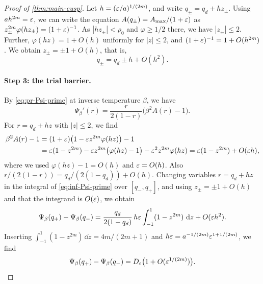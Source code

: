 \begin{proof}[Proof of \cref{thm:main-cusp}]
Let $h=(\varepsilon/a)^{1/(2m)}$, and write $q_\pm=q_d+hz_\pm$. Using $ah^{2m}=\varepsilon$, we can write the equation $A(q_\pm)=A_{\max}/(1+\varepsilon)$ as $z_\pm^{2m}\varphi(hz_\pm)=(1+\varepsilon)^{-1}$. As $|hz_\pm|<\rho_0$ and $\varphi\ge1/2$ there, we have $|z_\pm|\le2$. Further, $\varphi(hz)=1+O(h)$ uniformly for $|z|\le2$, and $(1+\varepsilon)^{-1}=1+O(h^{2m})$. We obtain $z_\pm=\pm1+O(h)$, that is,
\begin{equation}\label{eq:inf-roots}
q_\pm=q_d\pm h+O(h^2).
\end{equation}

\paragraph{Step 3: the trial barrier.} By \eqref{eq:pr-Psi-prime} at inverse temperature $\beta$, we have
\begin{equation}\label{eq:inf-Psi-prime}
\Psi_\beta'(r)=\frac r{2(1-r)}\bigl(\beta^2A(r)-1\bigr).
\end{equation}
For $r=q_d+hz$ with $|z|\le2$, we find
\begin{equation*}
\begin{split}
\beta^2A(r)-1&=(1+\varepsilon)\bigl(1-\varepsilon z^{2m}\varphi(hz)\bigr)-1\\
&=\varepsilon(1-z^{2m})-\varepsilon z^{2m}\bigl(\varphi(hz)-1\bigr)-\varepsilon^2z^{2m}\varphi(hz)=\varepsilon(1-z^{2m})+O(\varepsilon h),
\end{split}
\end{equation*}
where we used $\varphi(hz)-1=O(h)$ and $\varepsilon=O(h)$. Also $r/(2(1-r))=q_d/(2(1-q_d))+O(h)$. Changing variables $r=q_d+hz$ in the integral of \eqref{eq:inf-Psi-prime} over $[q_-,q_+]$, and using $z_\pm=\pm1+O(h)$ and that the integrand is $O(\varepsilon)$, we obtain
\begin{equation*}
\Psi_\beta(q_+)-\Psi_\beta(q_-)=\frac{q_d}{2(1-q_d)}\,h\varepsilon\int_{-1}^1(1-z^{2m})\,\,\mathrm d z+O(\varepsilon h^2).
\end{equation*}
Inserting $\int_{-1}^1(1-z^{2m})\,\dd z=4m/(2m+1)$ and $h\varepsilon=a^{-1/(2m)}\varepsilon^{1+1/(2m)}$, we find
\begin{equation}\label{eq:inf-barrier}
\Psi_\beta(q_+)-\Psi_\beta(q_-)=D_\varepsilon\bigl(1+O(\varepsilon^{1/(2m)})\bigr).
\end{equation}


\end{proof}
